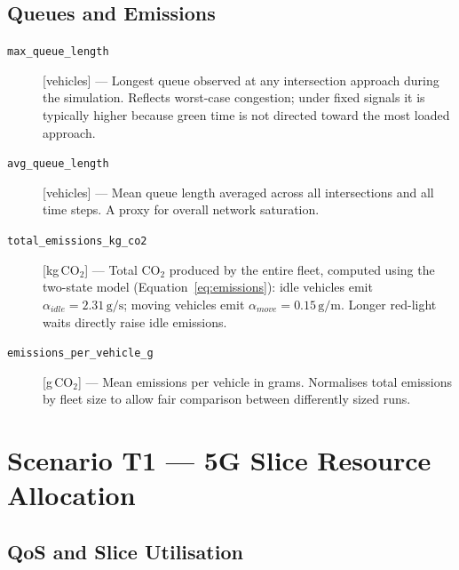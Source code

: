 \subsection*{Queues and Emissions}

\begin{description}

\item[\texttt{max\_queue\_length}] [vehicles] ---
  Longest queue observed at any intersection approach during the simulation.
  Reflects worst-case congestion; under fixed signals it is typically higher
  because green time is not directed toward the most loaded approach.

\item[\texttt{avg\_queue\_length}] [vehicles] ---
  Mean queue length averaged across all intersections and all time steps.  A
  proxy for overall network saturation.

\item[\texttt{total\_emissions\_kg\_co2}] [kg\,CO$_2$] ---
  Total CO$_2$ produced by the entire fleet, computed using the two-state model
  (Equation~\ref{eq:emissions}): idle vehicles emit
  $\alpha_{idle} = 2.31\,\text{g/s}$; moving vehicles emit
  $\alpha_{move} = 0.15\,\text{g/m}$.  Longer red-light waits directly raise
  idle emissions.

\item[\texttt{emissions\_per\_vehicle\_g}] [g\,CO$_2$] ---
  Mean emissions per vehicle in grams.  Normalises total emissions by fleet
  size to allow fair comparison between differently sized runs.

\end{description}

\section{Scenario T1 --- 5G Slice Resource Allocation}
\label{sec:metrics-t1}

\subsection*{QoS and Slice Utilisation}

